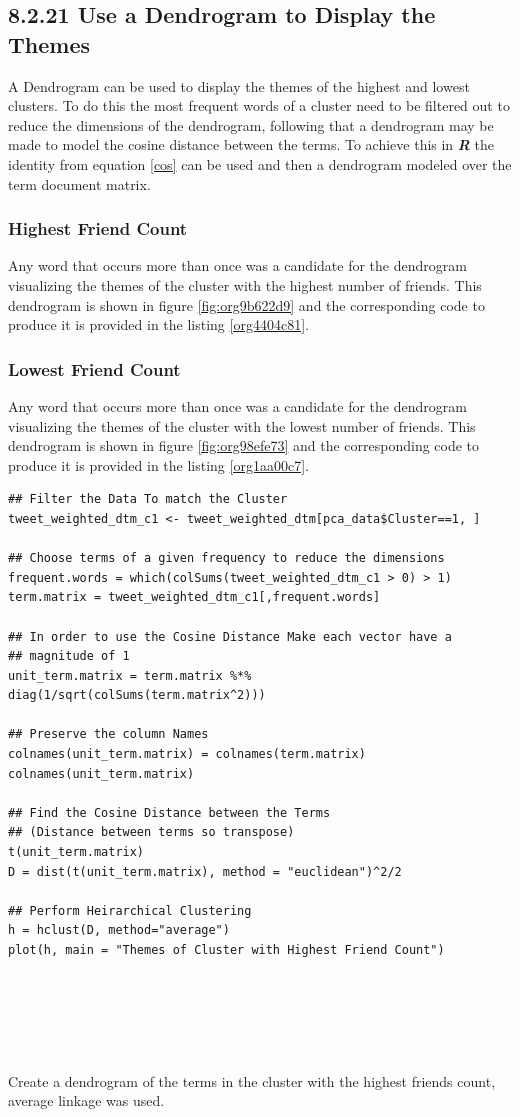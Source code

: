 \documentclass[11pt]{article}
\begin{document}
\subsection{8.2.21 Use a Dendrogram to Display the Themes}
\label{sec:org53fdf6e}
A Dendrogram can be used to display the themes of the highest and lowest
clusters. To do this the most frequent words of a cluster need to be
filtered out to reduce the dimensions of the dendrogram, following that
a dendrogram may be made to model the cosine distance between the terms. To
achieve this in \textbf{\emph{R}} the identity from equation \eqref{cos} can be used and
then a dendrogram modeled over the term document matrix.


\subsubsection{Highest Friend Count}
\label{sec:org45920c6}
Any word that occurs more than once was a candidate for the dendrogram visualizing the themes of the cluster with the highest number of friends. This dendrogram is shown in figure \ref{fig:org9b622d9} and the corresponding code to produce it is provided in the listing \ref{org4404c81}.

\subsubsection{Lowest Friend Count}
\label{sec:org75f7232}
Any word that occurs more than once was a candidate for the dendrogram visualizing the themes of the cluster with the lowest number of friends. This dendrogram is shown in figure \ref{fig:org98efe73} and the corresponding code to produce it is provided in the listing \ref{org1aa00c7}.

\begin{listing}[htbp]
\begin{verbatim}
## Filter the Data To match the Cluster
tweet_weighted_dtm_c1 <- tweet_weighted_dtm[pca_data$Cluster==1, ]

## Choose terms of a given frequency to reduce the dimensions
frequent.words = which(colSums(tweet_weighted_dtm_c1 > 0) > 1)
term.matrix = tweet_weighted_dtm_c1[,frequent.words]

## In order to use the Cosine Distance Make each vector have a
## magnitude of 1
unit_term.matrix = term.matrix %*% diag(1/sqrt(colSums(term.matrix^2)))

## Preserve the column Names
colnames(unit_term.matrix) = colnames(term.matrix)
colnames(unit_term.matrix)

## Find the Cosine Distance between the Terms
## (Distance between terms so transpose)
t(unit_term.matrix)
D = dist(t(unit_term.matrix), method = "euclidean")^2/2

## Perform Heirarchical Clustering
h = hclust(D, method="average")
plot(h, main = "Themes of Cluster with Highest Friend Count")






\end{verbatim}
\caption{\label{org4404c81}Create a dendrogram of the terms in the cluster with the highest friends count, average linkage was used.}
\end{listing}
\end{document}
